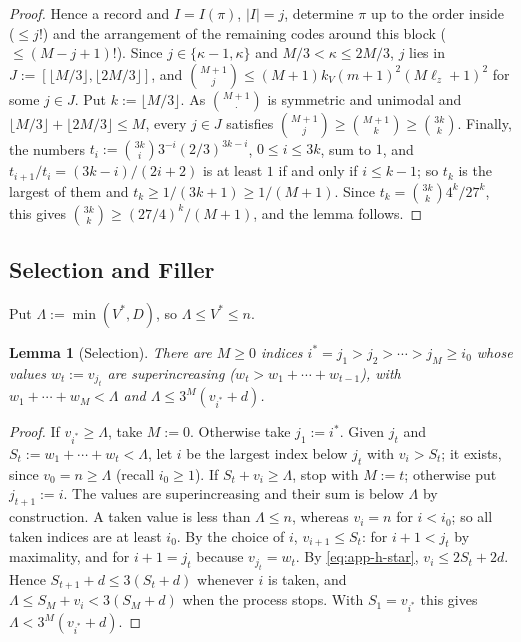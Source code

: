 \documentclass[11pt]{article}
\numberwithin{equation}{section}
\theoremstyle{plain}
\newtheorem{lemma}[theorem]{Lemma}
\theoremstyle{definition}
\theoremstyle{remark}
\theoremstyle{plain}
\begin{document}
\begin{proof}
Hence a record and $I=I(\pi)$, $|I|=j$, determine $\pi$ up to the order inside
($\le j!$) and the arrangement of the remaining codes around this block
($\le(M-j+1)!$).  Since $j\in\{\kappa-1,\kappa\}$ and $M/3<\kappa\le2M/3$, $j$
lies in $J:=[\lfloor M/3\rfloor,\lfloor2M/3\rfloor]$, and
$\binom{M+1}{j}\le(M+1)k_V(m+1)^2(M\ell_z+1)^2$ for some $j\in J$.  Put
$k:=\lfloor M/3\rfloor$.  As $\binom{M+1}{\cdot}$ is symmetric and unimodal and
$\lfloor M/3\rfloor+\lfloor2M/3\rfloor\le M$, every $j\in J$ satisfies
$\binom{M+1}{j}\ge\binom{M+1}{k}\ge\binom{3k}{k}$.  Finally, the numbers
$t_i:=\binom{3k}{i}3^{-i}(2/3)^{3k-i}$, $0\le i\le3k$, sum to $1$, and
$t_{i+1}/t_i=(3k-i)/(2i+2)$ is at least $1$ if and only if $i\le k-1$; so $t_k$
is the largest of them and $t_k\ge1/(3k+1)\ge1/(M+1)$.  Since
$t_k=\binom{3k}{k}4^k/27^k$, this gives $\binom{3k}{k}\ge(27/4)^k/(M+1)$, and the
lemma follows.
\end{proof}

\subsection{Selection and Filler}

Put $\Lambda:=\min(V^*,D)$, so $\Lambda\le V^*\le n$.

\begin{lemma}[Selection]
\label{lem:app-h-select}
There are $M\ge0$ indices $i^*=j_1>j_2>\cdots>j_M\ge i_0$ whose values
$w_t:=v_{j_t}$ are superincreasing \textup($w_t>w_1+\cdots+w_{t-1}$\textup), with
$w_1+\cdots+w_M<\Lambda$ and $\Lambda\le3^M(v_{i^*}+d)$.
\end{lemma}

\begin{proof}
If $v_{i^*}\ge\Lambda$, take $M:=0$.  Otherwise take $j_1:=i^*$.  Given
$j_t$ and $S_t:=w_1+\cdots+w_t<\Lambda$, let $i$ be the largest index below $j_t$
with $v_i>S_t$; it exists, since $v_0=n\ge\Lambda$ (recall $i_0\ge1$).  If
$S_t+v_i\ge\Lambda$, stop with $M:=t$; otherwise put $j_{t+1}:=i$.  The values
are superincreasing and their sum is below $\Lambda$ by construction.  A taken
value is less than $\Lambda\le n$, whereas $v_i=n$ for $i<i_0$; so all taken
indices are at least $i_0$.  By the choice of $i$, $v_{i+1}\le S_t$: for
$i+1<j_t$ by maximality, and for $i+1=j_t$ because $v_{j_t}=w_t$.  By
\eqref{eq:app-h-star}, $v_i\le2S_t+2d$.  Hence $S_{t+1}+d\le3(S_t+d)$ whenever $i$
is taken, and $\Lambda\le S_M+v_i<3(S_M+d)$ when the process stops.  With
$S_1=v_{i^*}$ this gives $\Lambda<3^M(v_{i^*}+d)$.
\end{proof}
\end{document}
